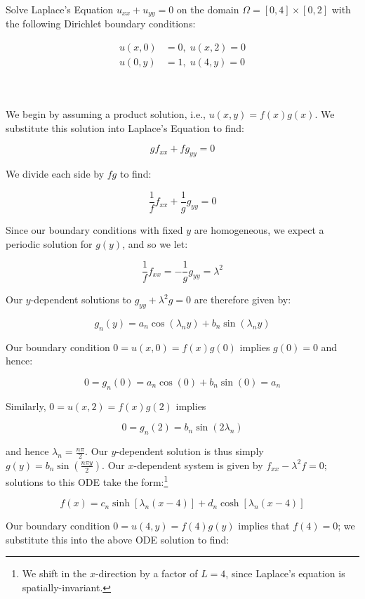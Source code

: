 Solve Laplace's Equation $u_{xx} + u_{yy} = 0$ on the domain $\Omega = [0, 4] \times [0, 2]$ with the following
Dirichlet boundary conditions: 

\begin{align*}
u(x, 0) &= 0, \; u(x, 2) = 0 \\
u(0, y) &= 1, \; u(4, y) = 0
\end{align*}

\begin{solution}\ \\\\
  We begin by assuming a product solution, i.e., $u(x, y) = f(x)g(x)$. We substitute this solution into Laplace's 
  Equation to find:

  $$
  gf_{xx} + fg_{yy} = 0
  $$

  We divide each side by $fg$ to find:

  $$
  \frac{1}{f}f_{xx} + \frac{1}{g}g_{yy} = 0
  $$


  Since our boundary conditions with fixed $y$ are homogeneous, we expect a periodic solution for $g(y)$, and so we let:

  $$
  \frac{1}{f}f_{xx} = -\frac{1}{g}g_{yy} = \lambda^2
  $$

  Our $y$-dependent solutions to $g_{yy} + \lambda^2 g = 0$ are therefore given by:

  $$
  g_n(y) = a_n \cos{\left(\lambda_n y \right)} + b_n \sin{\left(\lambda_n y \right)}
  $$

  Our boundary condition $0 = u(x, 0) = f(x)g(0)$ implies $g(0) = 0$ and hence:

  $$
  0 = g_n(0) = a_n \cos{\left(0\right)} + b_n \sin{\left(0\right)} = a_n
  $$

  Similarly, $0 = u(x, 2) = f(x)g(2)$ implies
  
  $$
  0 = g_n(2) = b_n \sin{\left(2 \lambda_n\right)}
  $$

  and hence $\lambda_n = \frac{n \pi}{2}$. Our $y$-dependent solution is thus simply 
  $g(y) = b_n \sin{(\frac{n \pi y}{2})}$. Our $x$-dependent system is given by $f_{xx} - \lambda^2 f = 0$; solutions
  to this ODE take the form:\footnote{
    We shift in the $x$-direction by a factor of $L = 4$, since Laplace's equation is spatially-invariant.
  }

  $$
    f(x) = c_n \sinh{[\lambda_n (x-4)]} + d_n \cosh{[\lambda_n (x-4)]}
  $$

  Our boundary condition $0 = u(4, y) = f(4)g(y)$ implies that $f(4) = 0$; we substitute this into the above ODE 
  solution to find:


\end{solution}

